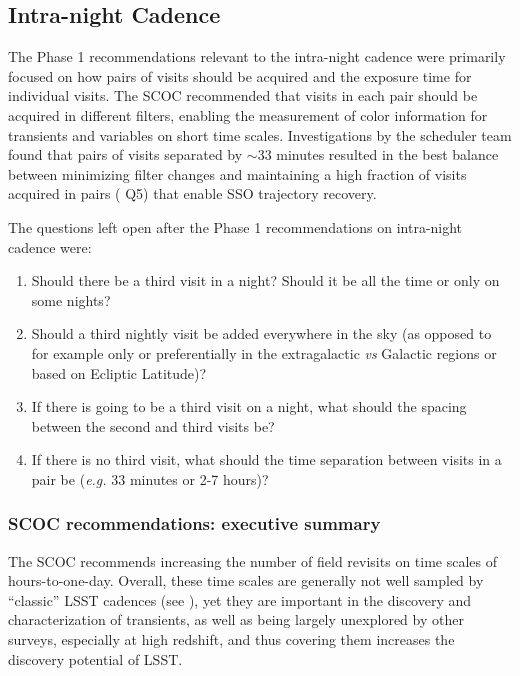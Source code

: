 \subsection{Intra-night Cadence}\label{q:Visits}

The Phase 1 recommendations relevant to the intra-night cadence were primarily focused on how pairs of visits should be acquired and the exposure time for individual visits. The SCOC recommended that visits in each pair should be acquired in different filters, enabling the measurement of color information for transients and variables on short time scales. Investigations by the scheduler team found that pairs of visits separated by $\sim33$ minutes resulted in the best balance between minimizing filter changes and maintaining a high fraction of visits acquired in pairs ( Q5) that enable SSO trajectory recovery. 

The questions left open after the Phase 1 recommendations on intra-night cadence were: 

\begin{enumerate}
\item Should there be a third visit in a night? Should it be all the time or only on some nights?
\item Should a third nightly visit be added everywhere in the sky (as opposed to for example only or preferentially in the extragalactic \emph{vs} Galactic regions or based on Ecliptic Latitude)?
\item If there is going to be a third visit on a night, what should the spacing between the second and third visits be?
\item If there is no third visit, what should the time separation between visits in a pair be (\emph{e.g.} 33 minutes or 2-7 hours)?
\end{enumerate}

\subsubsection{SCOC recommendations: executive summary}\label{rec:intranight_es}

The SCOC recommends increasing the number of field revisits on time scales of hours-to-one-day. Overall, these time scales are generally not well sampled by ``classic'' LSST cadences (see \citealt{2019PASP..131f8002B,2022ApJS..258...13B, 2022ApJS..258....2L}), yet they are important in the discovery and characterization of transients, as well as being largely unexplored by other surveys, especially at high redshift, and thus covering them increases the discovery potential of LSST.

